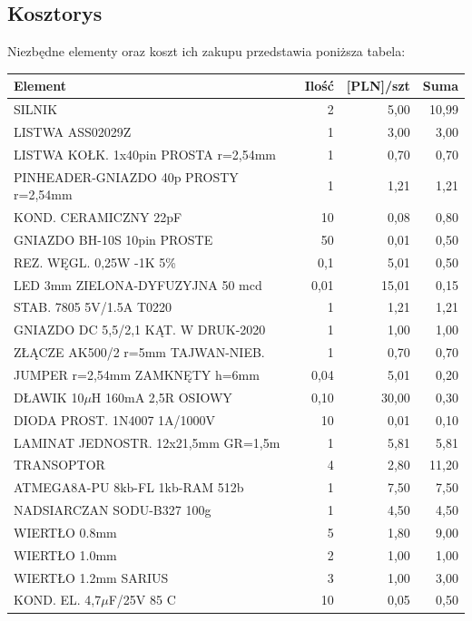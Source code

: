\documentclass[11pt,a4paper]{article}
\begin{document}
  
\vspace{3cm}
\subsection{Kosztorys}
Niezbędne elementy oraz koszt ich zakupu przedstawia poniższa tabela:
\begin{longtable}{|l|r|r|r|}
  \hline
  Element & Ilość & [PLN]/szt & Suma \\
  \hline \hline
  SILNIK & 2 & 5,00 & 10,99\\
  LISTWA ASS02029Z & 1 & 3,00 & 3,00 \\
  LISTWA KOŁK. 1x40pin PROSTA r=2,54mm & 1 & 0,70 & 0,70 \\
  PINHEADER-GNIAZDO 40p PROSTY r=2,54mm & 1 & 1,21 & 1,21 \\
  KOND. CERAMICZNY 22pF & 10 & 0,08 & 0,80 \\
  GNIAZDO BH-10S 10pin PROSTE & 50 & 0,01 & 0,50 \\
  REZ. WĘGL. 0,25W -1K 5\% & 0,1 & 5,01 & 0,50 \\
  LED 3mm ZIELONA-DYFUZYJNA 50 mcd & 0,01 & 15,01 & 0,15 \\
  STAB. 7805 5V/1.5A T0220 & 1 & 1,21 & 1,21 \\
  GNIAZDO DC 5,5/2,1 KĄT. W DRUK-2020 & 1 & 1,00 & 1,00 \\
  ZŁĄCZE AK500/2 r=5mm TAJWAN-NIEB. & 1 & 0,70 & 0,70 \\
  JUMPER r=2,54mm ZAMKNĘTY h=6mm & 0,04 & 5,01 & 0,20 \\
  DŁAWIK 10$\mu$H 160mA 2,5R OSIOWY & 0,10 & 30,00 & 0,30 \\
  DIODA PROST. 1N4007 1A/1000V & 10 & 0,01 & 0,10 \\
  LAMINAT JEDNOSTR. 12x21,5mm GR=1,5m & 1 & 5,81 & 5,81 \\
  TRANSOPTOR & 4 & 2,80 & 11,20 \\
  ATMEGA8A-PU 8kb-FL 1kb-RAM 512b & 1 & 7,50 & 7,50 \\
  NADSIARCZAN SODU-B327 100g & 1 & 4,50 & 4,50 \\
  WIERTŁO 0.8mm & 5 & 1,80 & 9,00 \\
  WIERTŁO 1.0mm & 2 & 1,00 & 1,00 \\
  WIERTŁO 1.2mm SARIUS & 3 & 1,00 & 3,00 \\
  KOND. EL. 4,7$\mu$F/25V 85 C & 10 & 0,05 & 0,50 \\ 

\end{longtable}
\end{document}
